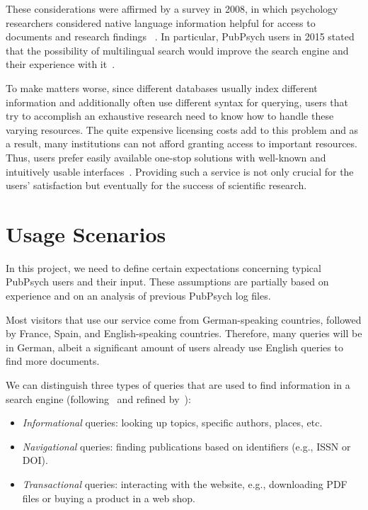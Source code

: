 \documentclass[a4paper,11pt]{article}
\begin{document}
These considerations were affirmed by a survey in 2008, in which psychology researchers considered native language information helpful for access to documents and research findings ~\cite{uhl:2009}. In particular, PubPsych users in 2015 stated that the possibility of multilingual search would improve the search engine and their experience with it~\cite{waeldin:2015}.

To make matters worse, since different databases usually index different information and additionally often use different syntax for querying, users that try to accomplish an exhaustive research need to know how to handle these varying resources. The quite expensive licensing costs add to this problem and as a result, many institutions can not afford granting access to important resources. Thus, users prefer easily available one-stop solutions with well-known and intuitively usable interfaces~\cite{hearst:2009}. Providing such a service is not only crucial for the users' satisfaction but eventually for the success of scientific research.

\section{Usage Scenarios}
\label{s:usage_scenarios}
In this project, we need to define certain expectations concerning typical PubPsych users and their input. These assumptions are partially based on experience and on an analysis of previous PubPsych log files.

Most visitors that use our service come from German-speaking countries, followed by France, Spain, and English-speaking countries. Therefore, many queries will be in German, albeit a significant amount of users already use English queries to find more documents.

We can distinguish three types of queries that are used to find information in a search engine (following~\cite{broder:2002} and refined by~\cite{liEtal:2017}):
\begin{itemize}
	\item{\textit{Informational} queries: looking up topics, specific authors, places, etc.}
	\item{\textit{Navigational} queries: finding publications based on identifiers (e.g., ISSN or DOI).}
	\item{\textit{Transactional} queries: interacting with the website, e.g., downloading PDF files or buying a product in a web shop.}
\end{itemize}
\end{document}
